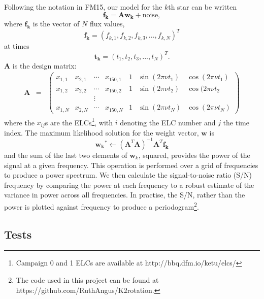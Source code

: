 \documentclass[useAMS, usenatbib, preprint, 12pt]{aastex}
\begin{document}
Following the notation in FM15, our model for the $k$th star can be written
\begin{equation}
	\mathbf{f_k} = \mathbf{A}\mathbf{w_k} + \mathrm{noise},
\end{equation}
where $\mathbf{f_k}$ is the vector of $N$ flux values,
\begin{equation}
	\mathbf{f_k} = (f_{k,1}, f_{k,2}, f_{k,3}, ..., f_{k,N})^T
\end{equation}
at times
\begin{equation}
	\mathbf{t_k} = (t_1, t_2, t_3, ..., t_N)^T.
\end{equation}
$\mathbf{A}$ is the design matrix:
\begin{eqnarray}
	\mathbf{A} &=& \left (\begin{array}{ccccccc}
	x_{1,1} & x_{2,1} & \cdots & x_{150,1} & 1 & \sin(2\pi\nu t_1) & \cos(2\pi\nu t_1) \\
	x_{1,2} & x_{2,2} & \cdots & x_{150,2} & 1 & \sin(2\pi\nu t_2) & \cos(2\pi\nu t_2\\
    && \vdots &&&\\
	x_{1,N} & x_{2,N} & \cdots & x_{150,N} & 1 & \sin(2\pi\nu t_N) & \cos(2\pi\nu t_N)
\end{array}\right )
\end{eqnarray}
where the $x_{ij}$s are the ELCs\footnote{Campaign 0 and 1 ELCs are
available at http://bbq.dfm.io/ketu/elcs/}, with $i$ denoting the ELC number
and $j$ the time index. The maximum likelihood solution for the weight vector,
$\mathbf{w}$ is
\begin{equation}
	\mathbf{w_k}^* \gets (\mathbf{A}^T\mathbf{A})^{-1}\mathbf{A}^T\mathbf{f_k} \end{equation}
and the sum of the last two elements of $\mathbf{w}_k$, squared, provides the
power of the signal at a given frequency.
This operation is performed over a grid of frequencies to produce a power
spectrum.
We then calculate the signal-to-noise ratio (S/N) frequency by comparing the
power at each frequency to a robust estimate of the variance in power across
all frequencies.
In practise, the S/N, rather than the power is plotted against frequency to
produce a periodogram\footnote{The code used in this project can be found at
https://github.com/RuthAngus/K2rotation.}.

\subsection{Tests}
\end{document}
